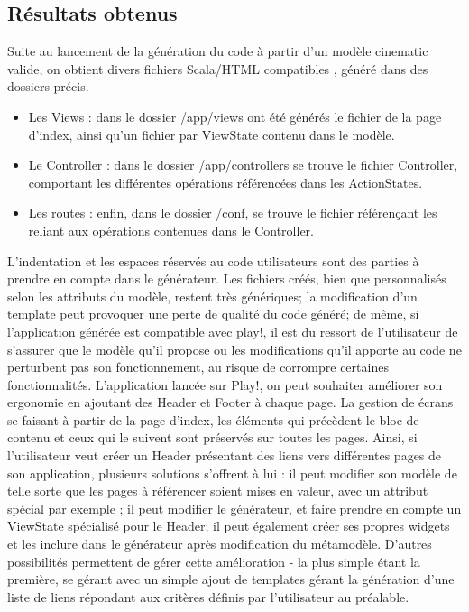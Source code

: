 \subsection{Résultats obtenus}
Suite au lancement de la génération du code à partir d'un modèle cinematic valide, on obtient divers fichiers Scala/HTML compatibles \kwplay{}, généré dans des dossiers précis.
\begin{itemize}
\item Les Views : dans le dossier /app/views ont été générés le fichier de la page d'index, ainsi qu'un fichier par ViewState contenu dans le modèle.
\item Le Controller : dans le dossier /app/controllers se trouve le fichier Controller, comportant les différentes opérations référencées dans les ActionStates.
\item Les routes : enfin, dans le dossier /conf, se trouve le fichier référençant les  reliant aux opérations contenues dans le Controller.
\end{itemize}
L'indentation et les espaces réservés au code utilisateurs sont des parties à prendre en compte dans le générateur. Les fichiers créés, bien que personnalisés selon les attributs du modèle, restent très génériques; la modification d'un template peut provoquer une perte de qualité du code généré; de même, si l'application générée est compatible avec play!, il est du ressort de l'utilisateur de s'assurer que le modèle qu'il propose ou les modifications qu'il apporte au code ne perturbent pas son fonctionnement, au risque de corrompre certaines fonctionnalités.
\newline
L'application lancée sur Play!, on peut souhaiter améliorer son ergonomie en ajoutant des Header et Footer à chaque page. La gestion de écrans se faisant à partir de la page d'index, les éléments qui précèdent le bloc de contenu et ceux qui le suivent sont préservés sur toutes les pages. Ainsi, si l'utilisateur veut créer un Header présentant des liens vers différentes pages de son application, plusieurs solutions s'offrent à lui : il peut modifier son modèle de telle sorte que les pages à référencer soient mises en valeur, avec un attribut spécial par exemple ; il peut modifier le générateur, et faire prendre en compte un ViewState spécialisé pour le Header; il peut également créer ses propres widgets et les inclure dans le générateur après modification du métamodèle. D'autres possibilités permettent de gérer cette amélioration - la plus simple étant la première, se gérant avec un simple ajout de templates gérant la génération d'une liste de liens répondant aux critères définis par l'utilisateur au préalable.
